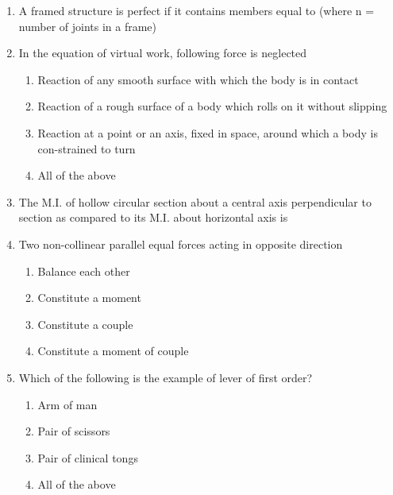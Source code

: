 \documentclass[11pt,a4paper]{article}
\begin{document}
\begin{enumerate}
\begin{enumerate*}[itemjoin=\qquad, label=\Alph*.]
\item{2.5 cm}
\end{enumerate*}
\item{A framed structure is perfect if it contains members equal to (where n = number of joints in a frame)}
\\
\item{In the equation of virtual work, following force is neglected}
\begin{enumerate}[label=\Alph*.]
\item{Reaction of any smooth surface with which the body is in contact}
\item{Reaction of a rough surface of a body which rolls on it without slipping}
\item{Reaction at a point or an axis, fixed in space, around which a body is con-strained to turn}
\item{All of the above}
\end{enumerate}
\item{The M.I. of hollow circular section about a central axis perpendicular to section as compared to its M.I. about horizontal axis is}
\\
\item{Two non-collinear parallel equal forces acting in opposite direction}
\begin{enumerate}[label=\Alph*.]
\item{Balance each other}
\item{Constitute a moment}
\item{Constitute a couple}
\item{Constitute a moment of couple}
\end{enumerate}
\item{Which of the following is the example of lever of first order?}
\begin{enumerate}[label=\Alph*.]
\item{Arm of man}
\item{Pair of scissors}
\item{Pair of clinical tongs}
\item{All of the above}
\end{enumerate}
\end{enumerate}
\end{document}
